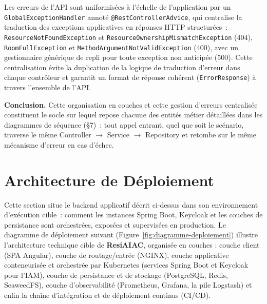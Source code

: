 \documentclass[a4paper,12pt]{article}
\begin{document}
Les erreurs de l'API sont uniformisées à l'échelle de l'application par un \texttt{GlobalExceptionHandler} annoté \texttt{@RestControllerAdvice}, qui centralise la traduction des exceptions applicatives en réponses HTTP structurées~: \texttt{ResourceNotFoundException} et \texttt{ResourceOwnershipMismatchException} (404), \texttt{RoomFullException} et \texttt{MethodArgumentNotValidException} (400), avec un gestionnaire générique de repli pour toute exception non anticipée (500). Cette centralisation évite la duplication de la logique de traduction d'erreur dans chaque contrôleur et garantit un format de réponse cohérent (\texttt{ErrorResponse}) à travers l'ensemble de l'API.

\textbf{Conclusion.} Cette organisation en couches et cette gestion d'erreurs centralisée constituent le socle sur lequel repose chacune des entités métier détaillées dans les diagrammes de séquence (\S7)~: tout appel entrant, quel que soit le scénario, traverse le même Controller $\rightarrow$ Service $\rightarrow$ Repository et retombe sur le même mécanisme d'erreur en cas d'échec.

\section{Architecture de Déploiement}

Cette section situe le backend applicatif décrit ci-dessus dans son environnement d'exécution cible~: comment les instances Spring Boot, Keycloak et les couches de persistance sont orchestrées, exposées et supervisées en production.
Le diagramme de déploiement suivant (Figure~\ref{fig:diagramme-deploiement}) illustre l'architecture technique cible de \textbf{ResiAIAC}, organisée en couches : couche client (SPA Angular), couche de routage/entrée (NGINX), couche applicative conteneurisée et orchestrée par Kubernetes (services Spring Boot et Keycloak pour l'IAM), couche de persistance et de stockage (PostgreSQL, Redis, SeaweedFS), couche d'observabilité (Prometheus, Grafana, la pile Logstash) et enfin la chaîne d'intégration et de déploiement continus (CI/CD).
\end{document}
